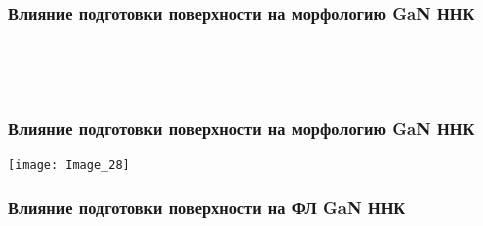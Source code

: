 \begin{frame}
	\frametitle{Влияние подготовки поверхности на морфологию GaN ННК}
	\centering
	\begin{minipage}[t]{0.31\linewidth}
	\end{minipage}
	\\
	\bigskip
	\begin{minipage}[t]{0.31\linewidth}
	\end{minipage}
	\begin{minipage}[t]{0.31\linewidth}
	\end{minipage}
	\begin{minipage}[t]{0.31\linewidth}
	\end{minipage}
	\\
	\bigskip
	\begin{minipage}[t]{0.31\linewidth}
	\end{minipage}
	\begin{minipage}[t]{0.31\linewidth}
	\end{minipage}
	\begin{minipage}[t]{0.31\linewidth}
	\end{minipage}
\end{frame}

\begin{frame}
	\frametitle{Влияние подготовки поверхности на морфологию GaN ННК}
	\centering
	\texttt{[image: Image\_28]}
\end{frame}

\begin{frame}
	\frametitle{Влияние подготовки поверхности на ФЛ GaN ННК}
	\centering
	\begin{minipage}[t]{0.47\linewidth}
	\end{minipage}
	\begin{minipage}[t]{0.47\linewidth}
	\end{minipage}
\end{frame}

